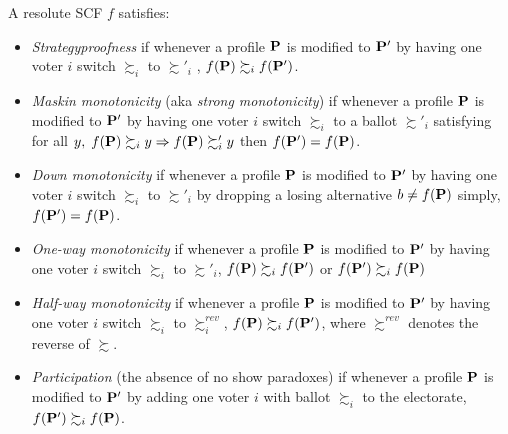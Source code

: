 \begin{definition}
    A resolute SCF $f$ satisfies:
    \begin{itemize}
        \item \textit{Strategyproofness} if whenever a profile $\mathbf{P}$ is modified to $\mathbf{P}'$ by having one voter $i$ switch $\succsim_i$ to $\succsim'_i$ , $f(\mathbf{P}) \succsim_i f(\mathbf{P}')$.
        \item \textit{Maskin monotonicity} (aka \textit{strong monotonicity}) if whenever a profile $\mathbf{P}$ is modified to $\mathbf{P}'$ by having one voter $i$ switch $\succsim_i$ to a ballot $\succsim'_i$ satisfying for all $y,\; f(\mathbf{P}) \succsim_i y \Rightarrow f(\mathbf{P}) \succsim'_i y$ then $f(\mathbf{P}') = f(\mathbf{P})$\footnotemark.
        \item \textit{Down monotonicity} if whenever a profile $\mathbf{P}$ is modified to $\mathbf{P}'$ by having one voter $i$ switch $\succsim_i$ to $\succsim'_i$ by dropping a losing alternative $b \neq f(\mathbf{P})$ simply, $f(\mathbf{P}') = f(\mathbf{P})$.
        \item \textit{One-way monotonicity} if whenever a profile $\mathbf{P}$ is modified to $\mathbf{P}'$ by having one voter $i$ switch $\succsim_i$ to $\succsim'_i$, $f(\mathbf{P}) \succsim_i f(\mathbf{P}')$ or $f(\mathbf{P}') \succsim_i f(\mathbf{P})$\footnotemark
        \item \textit{Half-way monotonicity} if whenever a profile $\mathbf{P}$ is modified to $\mathbf{P}'$ by having one voter $i$ switch $\succsim_i$ to $\succsim^{rev}_i$, $f(\mathbf{P}) \succsim_i f(\mathbf{P}')$, where $\succsim^{rev}$ denotes the reverse of $\succsim$.
        \item \textit{Participation} (the absence of no show paradoxes) if whenever a profile $\mathbf{P}$ is modified to $\mathbf{P}'$ by adding one voter $i$ with ballot $\succsim_i$ to the electorate, $f(\mathbf{P}') \succsim_i f(\mathbf{P})$.
    \end{itemize}
\end{definition}

